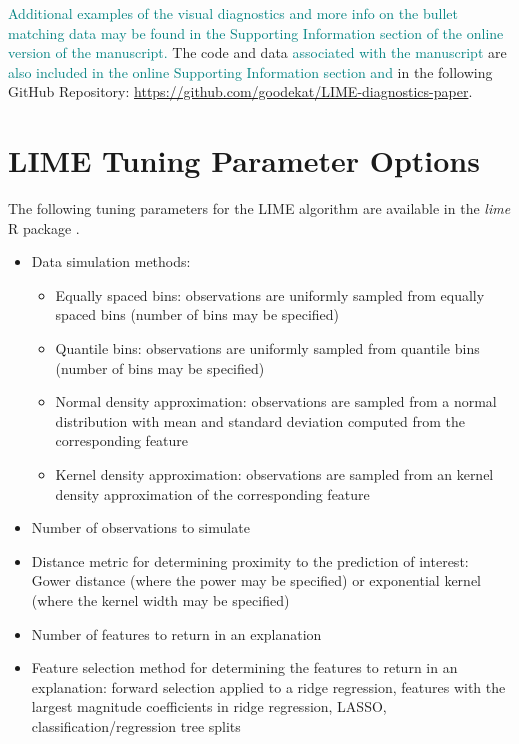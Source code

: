 \documentclass[AMS,STIX2COL]{WileyNJD-v2}\usepackage[]{graphicx}\usepackage[]{color}
\newcommand{\kge}[1]{\textcolor{teal}{#1}}
\renewcommand{\sout}[1]{\unskip}
\begin{document}
\kge{Additional examples of the visual diagnostics and more info on the bullet matching data may be found in the Supporting Information section of the online version of the manuscript.} The code \sout{used to produce the manuscript} and \sout{the} data \sout{from examples in Section \ref{application}} \kge{associated with the manuscript} are \kge{also included in the online Supporting Information section and} \sout{available} in the following GitHub Repository: \href{https://github.com/goodekat/LIME-diagnostics-paper}{https://github.com/goodekat/LIME-diagnostics-paper}.



\newpage

\appendix

\section{LIME Tuning Parameter Options} \label{lime-details}

The following tuning parameters for the LIME algorithm are available in the \emph{lime} R package \citep{pedersen:2020}.

\begin{itemize}

\item Data simulation methods:

\begin{itemize}
\item Equally spaced bins: observations are uniformly sampled from equally spaced bins (number of bins may be specified)
\item Quantile bins: observations are uniformly sampled from quantile bins (number of bins may be specified)
\item Normal density approximation: observations are sampled from a normal distribution with mean and standard deviation computed from the corresponding feature
\item Kernel density approximation: observations are sampled from an kernel density approximation of the corresponding feature
\end{itemize}

\item Number of observations to simulate

\item Distance metric for determining proximity to the prediction of interest: Gower distance (where the power may be specified) or exponential kernel (where the kernel width may be specified)

\item Number of features to return in an explanation

\item Feature selection method for determining the features to return in an explanation: forward selection applied to a ridge regression, features with the largest magnitude coefficients in ridge regression, LASSO, classification/regression tree splits

\end{itemize}
\end{document}
